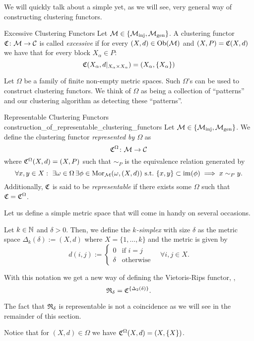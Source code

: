 We will quickly talk about a simple yet, as we will see, very general way of constructing clustering functors.

\begin{definition}{Excessive Clustering Functors \cite[Def.~6.2]{Carlsson2010}}{}
Let $\mathcal{M} \in \{{\mathcal{M}_\mathrm{inj}}, {\mathcal{M}_\mathrm{gen}}\}$. A clustering functor $\mathfrak{C}\colon \mathcal{M} \to \mathcal{C}$ is called \emph{excessive} if for every $(X,d) \in \mathrm {Ob}(\mathcal{M})$ and $(X,P) = \mathfrak{C}(X,d)$ we have that for every block $X_\alpha \in P$:
$$
\mathfrak{C}(X_\alpha, d|_{X_\alpha \times X_\alpha}) = (X_\alpha, \{X_\alpha\})
$$
\end{definition}

Let $\Omega$ be a family of finite non-empty metric spaces. Such $\Omega$'s can be used to construct clustering functors. We think of $\Omega$ as being a collection of ``patterns'' and our clustering algorithm as detecting these ``patterns''.

\begin{definition}{Representable Clustering Functors \cite[Sec.~6.2]{Carlsson2010}}{construction_of_representable_clustering_functors}
Let $\mathcal{M} \in \{{\mathcal{M}_\mathrm{inj}}, {\mathcal{M}_\mathrm{gen}}\}$. We define the clustering functor \emph{represented by $\Omega$} as
$$
\mathfrak{C}^\Omega\colon \mathcal{M} \to \mathcal{C}
$$
where $\mathfrak{C}^\Omega(X,d) = (X, P)$ such that $\sim_P$ 
is the equivalence relation generated by
\begin{equation*}
    \forall x,y \in X: \ \exists \omega \in \Omega \,\exists \phi \in \mathrm {Mor}_{\mathcal{M}}(\omega, (X,d)) \ \text{s.t.} \ \{x,y\} \subset \operatorname*{im}(\phi) \implies x \sim_P y.
\end{equation*}
Additionally, $\mathfrak{C}$ is said to be \emph{representable} if there exists some $\Omega$ such that $\mathfrak{C} = \mathfrak{C}^\Omega$.
\end{definition}

Let us define a simple metric space that will come in handy on several occasions.
\begin{definition}{}{}
    Let $k \in \mathbb N$ and $\delta > 0$. Then, we define the \emph{$k$-simplex} with size $\delta$ as the metric space $\Delta_k(\delta) := (X,d)$ where $X = \{1, \dots, k\}$ and the metric is given by
    $$
    d(i,j) := \begin{cases}
        0 & \text{if } i = j\\
        \delta & \text{otherwise}
    \end{cases} \quad \forall i,j \in X.
    $$
\end{definition}

\begin{example}{}{}
With this notation we get a new way of defining the Vietoris-Rips functor, \ie,
$$
\mathfrak{R}_\delta = \mathfrak{C}^{\{\Delta_2(\delta)\}}.
$$
\end{example}
The fact that $\mathfrak{R}_\delta$ is representable is not a coincidence as we will see in the remainder of this section.
\begin{myremark}{\cite[Rem.~6.3]{Carlsson2010}}{}
Notice that for $(X,d) \in \Omega$ we have $\mathfrak{C}^\Omega(X,d) = (X, \{X\})$.
\end{myremark}

